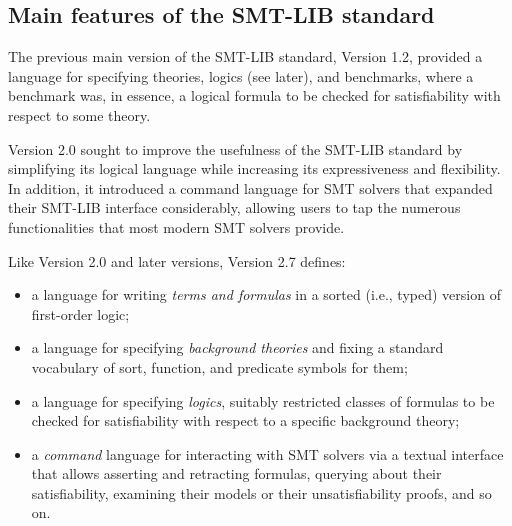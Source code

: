 \subsection{Main features of the SMT-LIB standard}

The previous main version of the SMT-LIB standard, Version 1.2, 
provided a language for specifying theories, logics (see later), and benchmarks,
where a benchmark was, in essence, a logical formula to be checked for 
satisfiability with respect to some theory.

Version 2.0 sought to improve the usefulness of the SMT-LIB standard
by simplifying its logical language 
while increasing its expressiveness and flexibility.
In addition, 
it introduced a command language for SMT solvers that 
expanded their SMT-LIB interface considerably,
allowing users to tap the numerous functionalities 
that most modern SMT solvers provide.

Like Version 2.0 and later versions, Version 2.7 defines:
\begin{itemize}
\item
a language for writing \emph{terms and formulas} in a sorted (i.e., typed) 
version of first-order logic;
\item
a language for specifying \emph{background theories} and 
fixing a standard vocabulary of sort, function, and predicate symbols for them;
\item
a language for specifying \emph{logics}, 
suitably restricted classes of formulas to be checked 
for satisfiability with respect to a specific background theory;
\item
a \emph{command} language for interacting with SMT solvers
via a textual interface
that allows asserting and retracting formulas, 
querying about their satisfiability, examining their models or 
their unsatisfiability proofs, and so on.

\end{itemize}

